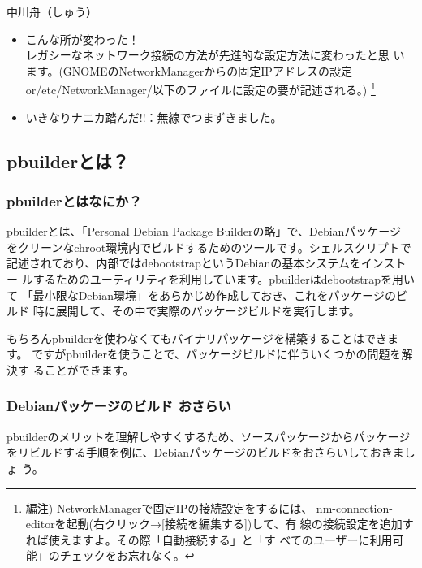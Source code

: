 \documentclass[mingoth,a4paper]{jsarticle}
\begin{document}
\begin{prework}{ 中川舟（しゅう） }
 \begin{itemize}
  \item こんな所が変わった！ \\
        レガシーなネットワーク接続の方法が先進的な設定方法に変わったと思
        います。(GNOMEのNetworkManagerからの固定IPアドレスの設定
        or/etc/NetworkManager/以下のファイルに設定の要が記述される。)
        \footnote{編注) NetworkManagerで固定IPの接続設定をするには、
        nm-connection-editorを起動(右クリック→[接続を編集する])して、有
        線の接続設定を追加すれば使えますよ。その際「自動接続する」と「す
        べてのユーザーに利用可能」のチェックをお忘れなく。}
  \item いきなりナニカ踏んだ!!：無線でつまずきました。
 \end{itemize}
\end{prework}



\subsection{pbuilderとは？}

\subsubsection{pbuilderとはなにか？}

pbuilderとは、「Personal Debian Package Builderの略」で、Debianパッケージ
をクリーンなchroot環境内でビルドするためのツールです。シェルスクリプトで
記述されており、内部ではdebootstrapというDebianの基本システムをインストー
ルするためのユーティリティを利用しています。pbuilderはdebootstrapを用いて
「最小限なDebian環境」をあらかじめ作成しておき、これをパッケージのビルド
時に展開して、その中で実際のパッケージビルドを実行します。

もちろんpbuilderを使わなくてもバイナリパッケージを構築することはできます。
ですがpbuilderを使うことで、パッケージビルドに伴ういくつかの問題を解決す
ることができます。

\subsubsection{Debianパッケージのビルド おさらい}

pbuilderのメリットを理解しやすくするため、ソースパッケージからパッケージ
をリビルドする手順を例に、Debianパッケージのビルドをおさらいしておきましょ
う。
\end{document}
